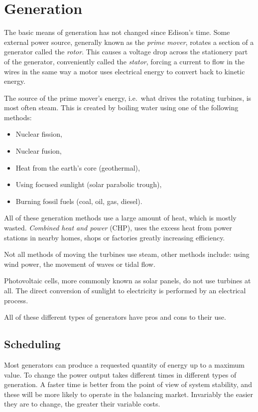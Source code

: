\documentclass[a4paper,oneside,12pt]{report}
\begin{document}
\section{Generation}

The basic means of generation has not changed since Edison's time. Some external power source, generally known as the \emph{prime mover}, rotates a section of a generator called the \emph{rotor}. This causes a voltage drop across the stationery part of the generator, conveniently called the \emph{stator}, forcing a current to flow in the wires in the same way a motor uses electrical energy to convert back to kinetic energy.

The source of the prime mover's energy, i.e.\ what drives the rotating turbines, is most often steam. This is created by boiling water using one of the following methods:

\begin{itemize}
\item Nuclear fission,
\item Nuclear fusion,
\item Heat from the earth's core (geothermal),
\item Using focused sunlight (solar parabolic trough),
\item Burning fossil fuels (coal, oil, gas, diesel).
\end{itemize}

All of these generation methods use a large amount of heat, which is mostly wasted. \emph{Combined heat and power} (CHP), uses the excess heat from power stations in nearby homes, shops or factories greatly increasing efficiency.

Not all methods of moving the turbines use steam, other methods include: using wind power, the movement of waves or tidal flow.

Photovoltaic cells, more commonly known as solar panels, do not use turbines at all. The direct conversion of sunlight to electricity is performed by an electrical process.

All of these different types of generators have pros and cons to their use.

\subsection{Scheduling}

Most generators can produce a requested quantity of energy up to a maximum value. To change the power output takes different times in different types of generation. A faster time is better from the point of view of system stability, and these will be more likely to operate in the balancing market. Invariably the easier they are to change, the greater their variable costs.
\end{document}
